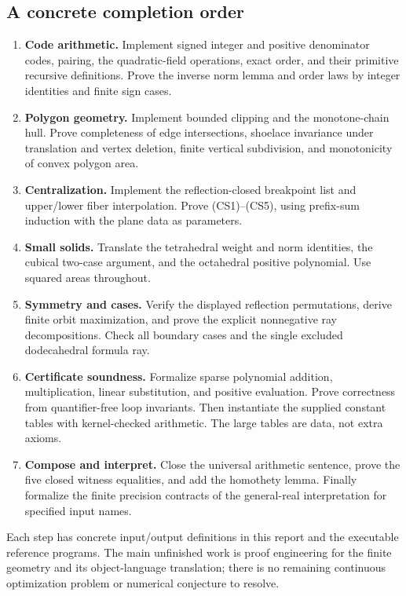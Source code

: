 \subsection{A concrete completion order}
\begin{enumerate}
\item \textbf{Code arithmetic.} Implement signed integer and positive
denominator codes, pairing, the quadratic-field operations, exact
order, and their primitive recursive definitions. Prove the inverse
norm lemma and order laws by integer identities and finite sign cases.
\item \textbf{Polygon geometry.} Implement bounded clipping and the
monotone-chain hull. Prove completeness of edge intersections,
shoelace invariance under translation and vertex deletion, finite
vertical subdivision, and monotonicity of convex polygon area.
\item \textbf{Centralization.} Implement the reflection-closed
breakpoint list and upper/lower fiber interpolation. Prove (CS1)--(CS5),
using prefix-sum induction with the plane data as parameters.
\item \textbf{Small solids.} Translate the tetrahedral weight and
norm identities, the cubical two-case argument, and the octahedral
positive polynomial. Use squared areas throughout.
\item \textbf{Symmetry and cases.} Verify the displayed reflection
permutations, derive finite orbit maximization, and prove the explicit
nonnegative ray decompositions. Check all boundary cases and the
single excluded dodecahedral formula ray.
\item \textbf{Certificate soundness.} Formalize sparse polynomial
addition, multiplication, linear substitution, and positive
evaluation. Prove correctness from quantifier-free loop invariants.
Then instantiate the supplied constant tables with kernel-checked
arithmetic. The large tables are data, not extra axioms.
\item \textbf{Compose and interpret.} Close the universal arithmetic
sentence, prove the five closed witness equalities, and add the
homothety lemma. Finally formalize the finite precision contracts of
the general-real interpretation for specified input names.
\end{enumerate}
Each step has concrete input/output definitions in this report and
the executable reference programs. The main unfinished work is proof
engineering for the finite geometry and its object-language
translation; there is no remaining continuous optimization problem
or numerical conjecture to resolve.
